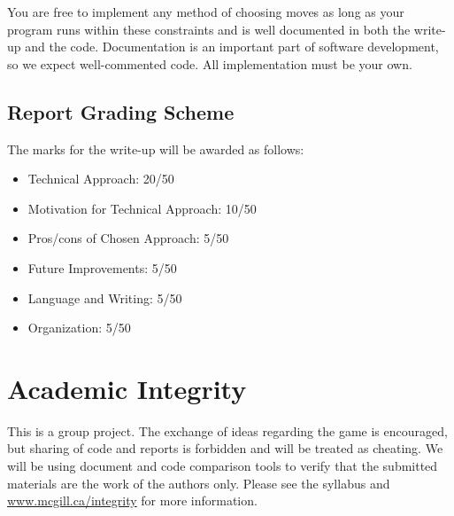 \documentclass[twoside,11pt]{article}
\begin{document}
You are free to implement any method of choosing moves as long as your program runs within these constraints and is well documented in both the write-up and the code. Documentation is an important part of software development, so we expect well-commented code. All implementation must be your own. 

\subsection{Report Grading Scheme}

The marks for the write-up will be awarded as follows:

\begin{itemize}
    \item Technical Approach: 20/50
    \item Motivation for Technical Approach: 10/50
    \item Pros/cons of Chosen Approach: 5/50
    \item Future Improvements: 5/50
    \item Language and Writing: 5/50
    \item Organization: 5/50
\end{itemize}





\section{Academic Integrity}

This is a group project. The exchange of ideas regarding the game is encouraged, but sharing of code and reports is forbidden and will be treated as cheating. We will be using document and code comparison tools to verify that the submitted materials are the work of the authors only. Please see the syllabus and \href{www.mcgill.ca/integrity}{www.mcgill.ca/integrity} for more information.
\end{document}

